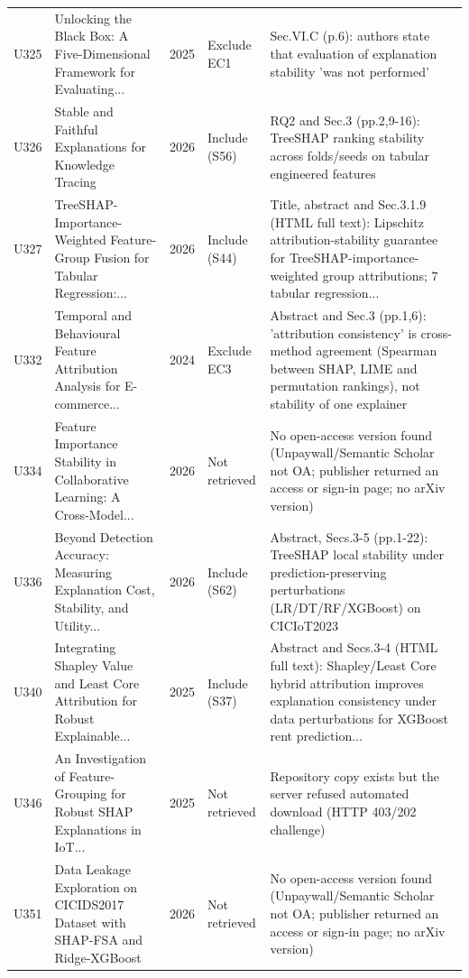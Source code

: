 \begin{longtable}{@{}P{1.0cm}P{6.3cm}P{0.7cm}P{1.6cm}P{6.1cm}@{}}
U325 & Unlocking the Black Box: A Five-Dimensional Framework for Evaluating... & 2025 & Exclude EC1 & Sec.VI.C (p.6): authors state that evaluation of explanation stability 'was not performed' \\
U326 & Stable and Faithful Explanations for Knowledge Tracing & 2026 & Include (S56) & RQ2 and Sec.3 (pp.2,9-16): TreeSHAP ranking stability across folds/\allowbreak{}seeds on tabular engineered features \\
U327 & TreeSHAP-Importance-Weighted Feature-Group Fusion for Tabular Regression:... & 2026 & Include (S44) & Title, abstract and Sec.3.1.9 (HTML full text): Lipschitz attribution-stability guarantee for TreeSHAP-importance-weighted group attributions; 7 tabular regression... \\
U332 & Temporal and Behavioural Feature Attribution Analysis for E-commerce... & 2024 & Exclude EC3 & Abstract and Sec.3 (pp.1,6): 'attribution consistency' is cross-method agreement (Spearman between SHAP, LIME and permutation rankings), not stability of one explainer \\
U334 & Feature Importance Stability in Collaborative Learning: A Cross-Model... & 2026 & Not retrieved & No open-access version found (Unpaywall/\allowbreak{}Semantic Scholar not OA; publisher returned an access or sign-in page; no arXiv version) \\
U336 & Beyond Detection Accuracy: Measuring Explanation Cost, Stability, and Utility... & 2026 & Include (S62) & Abstract, Secs.3-5 (pp.1-22): TreeSHAP local stability under prediction-preserving perturbations (LR/\allowbreak{}DT/\allowbreak{}RF/\allowbreak{}XGBoost) on CICIoT2023 \\
U340 & Integrating Shapley Value and Least Core Attribution for Robust Explainable... & 2025 & Include (S37) & Abstract and Secs.3-4 (HTML full text): Shapley/\allowbreak{}Least Core hybrid attribution improves explanation consistency under data perturbations for XGBoost rent prediction... \\
U346 & An Investigation of Feature-Grouping for Robust SHAP Explanations in IoT... & 2025 & Not retrieved & Repository copy exists but the server refused automated download (HTTP 403/\allowbreak{}202 challenge) \\
U351 & Data Leakage Exploration on CICIDS2017 Dataset with SHAP-FSA and Ridge-XGBoost & 2026 & Not retrieved & No open-access version found (Unpaywall/\allowbreak{}Semantic Scholar not OA; publisher returned an access or sign-in page; no arXiv version) \\

\end{longtable}

